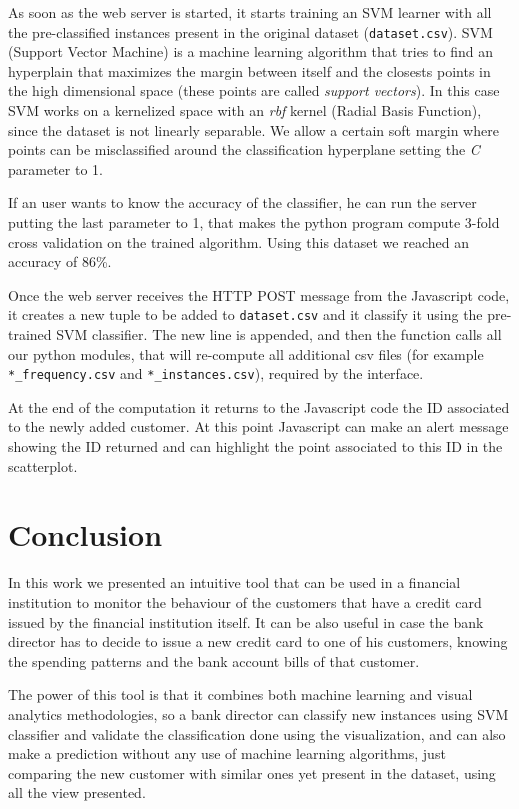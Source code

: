 \documentclass[journal]{vgtc}                %
\begin{document}
As soon as the web server is started, it starts training an SVM learner with all the pre-classified instances present in the original dataset (\texttt{dataset.csv}).
SVM (Support Vector Machine) \cite{Boser:1992:TAO:130385.130401} is a machine learning algorithm that tries to find an hyperplain that maximizes the margin between itself and the closests points in the high dimensional space (these points are called \textit{support vectors}). In this case
SVM works on a kernelized space with an \textit{rbf} kernel (Radial Basis Function), since the dataset is not linearly separable.
We allow a certain soft margin where points can be misclassified around the classification hyperplane setting the \textit{C} parameter to 1.

If an user wants to know the accuracy of the classifier, he can run the server putting the last parameter to 1, that makes the python program compute 3-fold cross validation on the trained algorithm. Using this dataset we reached an accuracy of 86\%.

Once the web server receives the HTTP POST message from the Javascript code, it creates a new tuple to be added to \texttt{dataset.csv} and it classify it using the pre-trained SVM classifier. The new line is appended, and then the function calls all our python modules,
 that will re-compute all additional csv files (for example \texttt{*\_frequency.csv} and \texttt{*\_instances.csv}), required by the interface.


At the end of the computation it returns to the Javascript code the ID associated to the newly added customer.
At this point Javascript can make an alert message showing the ID returned and can highlight the point associated to this ID in the scatterplot.

\section{Conclusion}

In this work we presented an intuitive tool that can be used in a financial institution to monitor the behaviour of the customers that have a credit card issued by the financial institution itself. It can be also useful in case
the bank director has to decide to issue a new credit card to one of his customers, knowing the spending patterns and the bank account bills of that customer.

The power of this tool is that it combines both machine learning and visual analytics methodologies, so a bank director can classify new instances using SVM classifier and validate the classification done using the visualization, and can also make a prediction
without any use of machine learning algorithms, just comparing the new customer with similar ones yet present in the dataset, using all the view presented.
\end{document}
